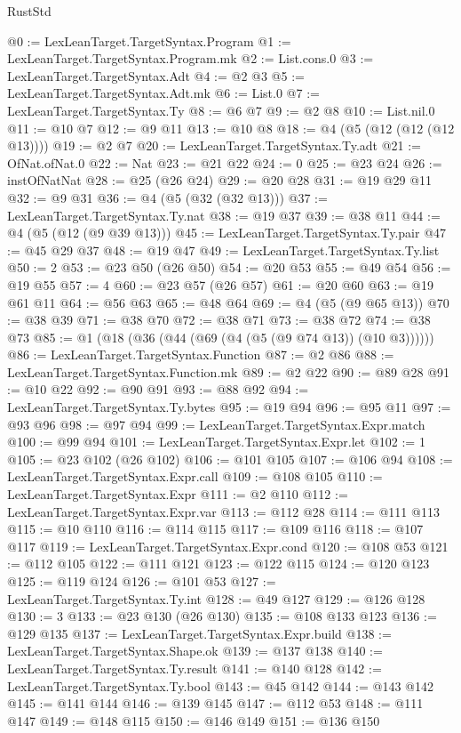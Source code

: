 \begin{lexlean}{RustStd}
\begin{coremodule}
@0 := LexLeanTarget.TargetSyntax.Program
@1 := LexLeanTarget.TargetSyntax.Program.mk
@2 := List.cons.{0}
@3 := LexLeanTarget.TargetSyntax.Adt
@4 := @2 @3
@5 := LexLeanTarget.TargetSyntax.Adt.mk
@6 := List.{0}
@7 := LexLeanTarget.TargetSyntax.Ty
@8 := @6 @7
@9 := @2 @8
@10 := List.nil.{0}
@11 := @10 @7
@12 := @9 @11
@13 := @10 @8
@18 := @4 (@5 (@12 (@12 (@12 @13))))
@19 := @2 @7
@20 := LexLeanTarget.TargetSyntax.Ty.adt
@21 := OfNat.ofNat.{0}
@22 := Nat
@23 := @21 @22
@24 := 0
@25 := @23 @24
@26 := instOfNatNat
@28 := @25 (@26 @24)
@29 := @20 @28
@31 := @19 @29 @11
@32 := @9 @31
@36 := @4 (@5 (@32 (@32 @13)))
@37 := LexLeanTarget.TargetSyntax.Ty.nat
@38 := @19 @37
@39 := @38 @11
@44 := @4 (@5 (@12 (@9 @39 @13)))
@45 := LexLeanTarget.TargetSyntax.Ty.pair
@47 := @45 @29 @37
@48 := @19 @47
@49 := LexLeanTarget.TargetSyntax.Ty.list
@50 := 2
@53 := @23 @50 (@26 @50)
@54 := @20 @53
@55 := @49 @54
@56 := @19 @55
@57 := 4
@60 := @23 @57 (@26 @57)
@61 := @20 @60
@63 := @19 @61 @11
@64 := @56 @63
@65 := @48 @64
@69 := @4 (@5 (@9 @65 @13))
@70 := @38 @39
@71 := @38 @70
@72 := @38 @71
@73 := @38 @72
@74 := @38 @73
@85 := @1 (@18 (@36 (@44 (@69 (@4 (@5 (@9 @74 @13)) (@10 @3))))))
@86 := LexLeanTarget.TargetSyntax.Function
@87 := @2 @86
@88 := LexLeanTarget.TargetSyntax.Function.mk
@89 := @2 @22
@90 := @89 @28
@91 := @10 @22
@92 := @90 @91
@93 := @88 @92
@94 := LexLeanTarget.TargetSyntax.Ty.bytes
@95 := @19 @94
@96 := @95 @11
@97 := @93 @96
@98 := @97 @94
@99 := LexLeanTarget.TargetSyntax.Expr.match
@100 := @99 @94
@101 := LexLeanTarget.TargetSyntax.Expr.let
@102 := 1
@105 := @23 @102 (@26 @102)
@106 := @101 @105
@107 := @106 @94
@108 := LexLeanTarget.TargetSyntax.Expr.call
@109 := @108 @105
@110 := LexLeanTarget.TargetSyntax.Expr
@111 := @2 @110
@112 := LexLeanTarget.TargetSyntax.Expr.var
@113 := @112 @28
@114 := @111 @113
@115 := @10 @110
@116 := @114 @115
@117 := @109 @116
@118 := @107 @117
@119 := LexLeanTarget.TargetSyntax.Expr.cond
@120 := @108 @53
@121 := @112 @105
@122 := @111 @121
@123 := @122 @115
@124 := @120 @123
@125 := @119 @124
@126 := @101 @53
@127 := LexLeanTarget.TargetSyntax.Ty.int
@128 := @49 @127
@129 := @126 @128
@130 := 3
@133 := @23 @130 (@26 @130)
@135 := @108 @133 @123
@136 := @129 @135
@137 := LexLeanTarget.TargetSyntax.Expr.build
@138 := LexLeanTarget.TargetSyntax.Shape.ok
@139 := @137 @138
@140 := LexLeanTarget.TargetSyntax.Ty.result
@141 := @140 @128
@142 := LexLeanTarget.TargetSyntax.Ty.bool
@143 := @45 @142
@144 := @143 @142
@145 := @141 @144
@146 := @139 @145
@147 := @112 @53
@148 := @111 @147
@149 := @148 @115
@150 := @146 @149
@151 := @136 @150

\end{coremodule}
\end{lexlean}

